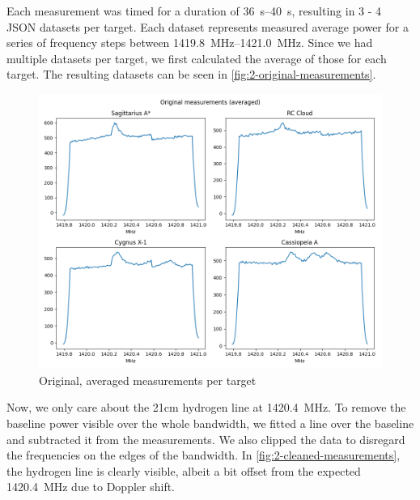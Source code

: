 \newpage
Each measurement was timed for a duration of \SIrange{36}{40}{\second}, resulting in 3 - 4 JSON datasets per target. Each dataset represents measured average power for a series of frequency steps between \SIrange{1419.8}{1421.0}{\mega\hertz}. Since we had multiple datasets per target, we first calculated the average of those for each target. The resulting datasets can be seen in \autoref{fig:2-original-measurements}.

\begin{figure}[H]
    \centering
    \includegraphics[width=\linewidth]{Doc//Graphics/2-original-measurements.png}
    \caption{Original, averaged measurements per target}
    \label{fig:2-original-measurements}
\end{figure}

\vspace{1cm}
Now, we only care about the 21cm hydrogen line at \SI{1420.4}{\mega\hertz}. To remove the baseline power visible over the whole bandwidth, we fitted a line over the baseline and subtracted it from the measurements. We also clipped the data to disregard the frequencies on the edges of the bandwidth. In \autoref{fig:2-cleaned-measurements}, the hydrogen line is clearly visible, albeit a bit offset from the expected \SI{1420.4}{\mega\hertz} due to Doppler shift.


